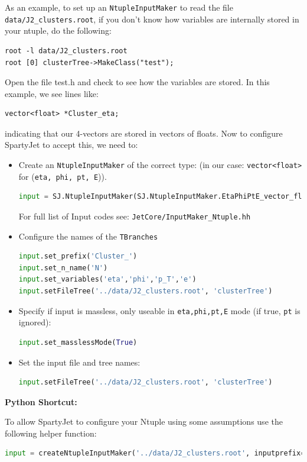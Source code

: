 \documentclass{article}
\newcommand{\prog}[1]{{\sc #1}\xspace}
\newcommand{\code}[1]{{\tt #1}\xspace}
\newcommand{\SJ}[0]{\prog{SpartyJet}}
\begin{document}
As an example, to set up an \code{NtupleInputMaker} to read the file \verb+data/J2_clusters.root+,
if you don't know how variables are internally stored in your ntuple, do the following:
\begin{verbatim} 
root -l data/J2_clusters.root
root [0] clusterTree->MakeClass("test");
\end{verbatim}
Open the file test.h and check to see how the variables are stored.  In this example, we see lines like:
\begin{lstlisting} 
vector<float> *Cluster_eta;
\end{lstlisting}
indicating that our 4-vectors are stored in vectors of floats.  Now to configure \SJ to accept this, we need to:

\begin{itemize}
\item Create an \code{NtupleInputMaker} of the correct type: (in our case: \code{vector<float>} for (\code{eta, phi, pt, E})).
\begin{lstlisting}[language=Python]
input = SJ.NtupleInputMaker(SJ.NtupleInputMaker.EtaPhiPtE_vector_float)
\end{lstlisting}
For full list of Input codes see: 
\verb+JetCore/InputMaker_Ntuple.hh+

\item Configure the names of the \code{TBranches}
\begin{lstlisting}[language=Python]
input.set_prefix('Cluster_')
input.set_n_name('N')
input.set_variables('eta','phi','p_T','e')
input.setFileTree('../data/J2_clusters.root', 'clusterTree')
\end{lstlisting}

\item Specify if input is massless, only useable in \code{eta,phi,pt,E} mode (if true, \code{pt} is ignored):
\begin{lstlisting}[language=Python]
input.set_masslessMode(True)
\end{lstlisting}

\item Set the input file and tree names:
\begin{lstlisting}[language=Python]
input.setFileTree('../data/J2_clusters.root', 'clusterTree')
\end{lstlisting}
\end{itemize}

{\bf Python Shortcut:}

To allow \SJ to configure your Ntuple using some assumptions use the following helper function:
\begin{lstlisting}[language=Python]
input = createNtupleInputMaker('../data/J2_clusters.root', inputprefix='Cluster')
\end{lstlisting}
\end{document}
